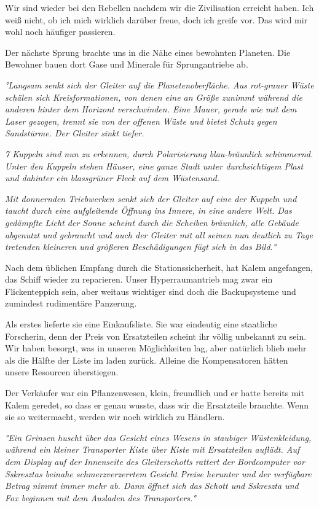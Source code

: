 \documentclass[11pt]{article}
\begin{document}
Wir sind wieder bei den Rebellen nachdem wir die Zivilisation erreicht
haben. Ich weiß nicht, ob ich mich wirklich darüber freue, doch ich
greife vor. Das wird mir wohl noch häufiger passieren.

Der nächste Sprung brachte uns in die Nähe eines bewohnten Planeten. Die
Bewohner bauen dort Gase und Minerale für Sprungantriebe ab.

\emph{°Langsam senkt sich der Gleiter auf die Planetenoberfläche. Aus
rot-grauer Wüste schälen sich Kreisformationen, von denen eine an Größe
zunimmt während die anderen hinter dem Horizont verschwinden. Eine
Mauer, gerade wie mit dem Laser gezogen, trennt sie von der offenen
Wüste und bietet Schutz gegen Sandstürme. Der Gleiter sinkt tiefer.}

\emph{7 Kuppeln sind nun zu erkennen, durch Polarisierung blau-bräunlich
schimmernd. Unter den Kuppeln stehen Häuser, eine ganze Stadt unter
durchsichtigem Plast und dahinter ein blassgrüner Fleck auf dem
Wüstensand.}

\emph{Mit donnernden Triebwerken senkt sich der Gleiter auf eine der
Kuppeln und taucht durch eine aufgleitende Öffnung ins Innere, in eine
andere Welt. Das gedämpfte Licht der Sonne scheint durch die Scheiben
bräunlich, alle Gebäude abgenutzt und gebraucht und auch der Gleiter mit
all seinen nun deutlich zu Tage tretenden kleineren und größeren
Beschädigungen fügt sich in das Bild.°}

Nach dem üblichen Empfang durch die Stationssicherheit, hat Kalem
angefangen, das Schiff wieder zu reparieren. Unser Hyperraumantrieb mag
zwar ein Flickenteppich sein, aber weitaus wichtiger sind doch die
Backupsysteme und zumindest rudimentäre Panzerung.

Als erstes lieferte sie eine Einkaufsliste. Sie war eindeutig eine
staatliche Forscherin, denn der Preis von Ersatzteilen scheint ihr
völlig unbekannt zu sein. Wir haben besorgt, was in unseren
Möglichkeiten lag, aber natürlich blieb mehr als die Hälfte der Liste im
laden zurück. Alleine die Kompensatoren hätten unsere Resourcen
überstiegen.

Der Verkäufer war ein Pflanzenwesen, klein, freundlich und er hatte
bereits mit Kalem geredet, so dass er genau wusste, dass wir die
Ersatzteile brauchte. Wenn sie so weitermacht, werden wir noch wirklich
zu Händlern.

\emph{°Ein Grinsen huscht über das Gesicht eines Wesens in staubiger
Wüstenkleidung, während ein kleiner Transporter Kiste über Kiste mit
Ersatzteilen auflädt. Auf dem Display auf der Innenseite des
Gleiterschotts rattert der Bordcomputer vor Sskresztas beinahe
schmerzverzerrtem Gesicht Preise herunter und der verfügbare Betrag
nimmt immer mehr ab. Dann öffnet sich das Schott und Sskreszta und Fox
beginnen mit dem Ausladen des Transporters.°}
\end{document}

